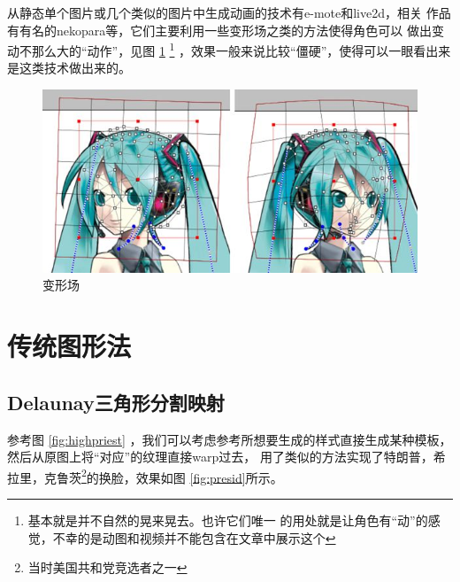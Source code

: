 \documentclass[twocolumn,11pt]{ctexart}
\begin{document}
从静态单个图片或几个类似的图片中生成动画的技术有e-mote和live2d，相关
作品有有名的nekopara等，它们主要利用一些变形场之类的方法使得角色可以
做出变动不那么大的“动作”，见图 \ref{fig:miku} 
\footnote{基本就是并不自然的晃来晃去。也许它们唯一
的用处就是让角色有“动”的感觉，不幸的是动图和视频并不能包含在文章中展示这个}
，效果一般来说比较“僵硬”，使得可以一眼看出来是这类技术做出来的。

\begin{figure}[htb]
    \centering
    \includegraphics[width=0.7\linewidth]{miku.jpg}
    \caption{变形场}
    \label{fig:miku}
\end{figure}

\section{传统图形法}

\subsection{Delaunay三角形分割映射}

参考图 \ref{fig:highpriest} ，我们可以考虑参考所想要生成的样式直接生成某种模板，然后从原图上将“对应”的纹理直接warp过去，
\cite{swapface}用了类似的方法实现了特朗普，希拉里，克鲁茨\footnote{当时美国共和党竞选者之一}的换脸，效果如图 
\ref{fig:presid}所示。
\end{document}
